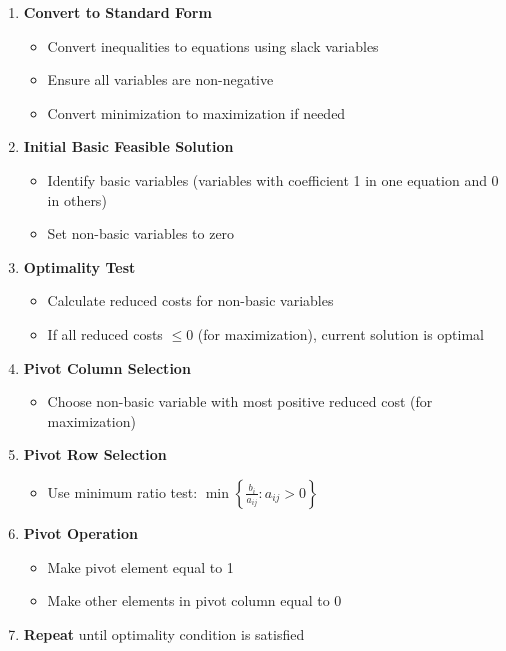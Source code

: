 \documentclass[
  letterpaper,
  DIV=11,
  numbers=noendperiod]{scrreprt}
\providecommand{\tightlist}{%
  \setlength{\itemsep}{0pt}\setlength{\parskip}{0pt}}
\begin{document}
\begin{enumerate}
\def\labelenumi{\arabic{enumi}.}
\item
  \textbf{Convert to Standard Form}

  \begin{itemize}
  \tightlist
  \item
    Convert inequalities to equations using slack variables
  \item
    Ensure all variables are non-negative
  \item
    Convert minimization to maximization if needed
  \end{itemize}
\item
  \textbf{Initial Basic Feasible Solution}

  \begin{itemize}
  \tightlist
  \item
    Identify basic variables (variables with coefficient 1 in one
    equation and 0 in others)
  \item
    Set non-basic variables to zero
  \end{itemize}
\item
  \textbf{Optimality Test}

  \begin{itemize}
  \tightlist
  \item
    Calculate reduced costs for non-basic variables
  \item
    If all reduced costs \(\leq 0\) (for maximization), current solution
    is optimal
  \end{itemize}
\item
  \textbf{Pivot Column Selection}

  \begin{itemize}
  \tightlist
  \item
    Choose non-basic variable with most positive reduced cost (for
    maximization)
  \end{itemize}
\item
  \textbf{Pivot Row Selection}

  \begin{itemize}
  \tightlist
  \item
    Use minimum ratio test:
    \(\min \left\{ \frac{b_i}{a_{ij}} : a_{ij} > 0 \right\}\)
  \end{itemize}
\item
  \textbf{Pivot Operation}

  \begin{itemize}
  \tightlist
  \item
    Make pivot element equal to 1
  \item
    Make other elements in pivot column equal to 0
  \end{itemize}
\item
  \textbf{Repeat} until optimality condition is satisfied
\end{enumerate}
\end{document}

